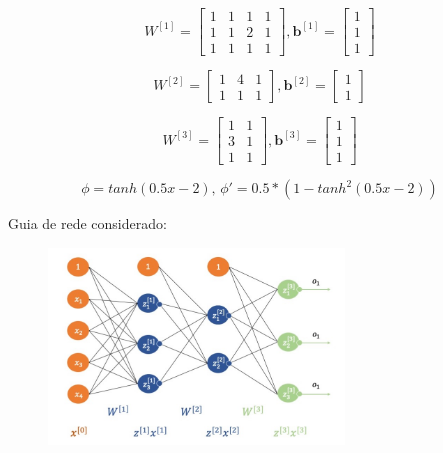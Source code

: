 \documentclass[a4paper,12pt]{article} %
\begin{document}
\begin{enumerate}
\begin{equation*}
    W^{[1]} = \begin{bmatrix} 1 & 1 & 1 & 1 \\ 1 & 1 & 2 & 1 \\ 1 & 1 & 1 & 1 \end{bmatrix} , \textbf{b}^{[1]} = \begin{bmatrix} 1 \\ 1 \\ 1 \end{bmatrix}
\end{equation*}

\begin{equation*}
    W^{[2]} = \begin{bmatrix} 1 & 4 & 1 \\  1 & 1 & 1 \end{bmatrix} , \textbf{b}^{[2]} = \begin{bmatrix} 1 \\ 1 \end{bmatrix}
\end{equation*}

\begin{equation*}
    W^{[3]} = \begin{bmatrix} 1 & 1 \\ 3 & 1 \\ 1 & 1 \end{bmatrix} , \textbf{b}^{[3]} = \begin{bmatrix} 1 \\ 1 \\ 1 \end{bmatrix}
\end{equation*}

\begin{equation*}
    \phi = tanh(0.5x -2) \text{, } \phi' = 0.5 * (1 - tanh^2(0.5x -2))
\end{equation*}

Guia de rede considerado:

\begin{figure}[H]
    \centering
    \includegraphics[width=0.7\textwidth]{rede.jpg}
\end{figure}


\end{enumerate}
\end{document}
